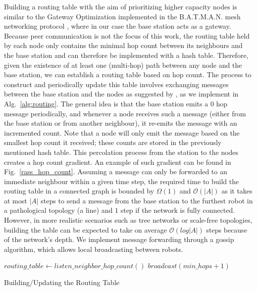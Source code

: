 Building a routing 
table with the aim of prioritizing higher capacity nodes is similar to the Gateway 
Optimization \cite{openMesh2021gateways} implemented in the \ac{B.A.T.M.A.N.} mesh networking
protocol \cite{johnson2008simple}, where in our case the base station acts as a gateway. Because peer communication is not the 
focus of this work, the routing table held by each node only contains the minimal hop count 
between its neighbours and the base station and can therefore
be implemented with a hash table. Therefore, given the existence of at least one (multi-hop) path between any node and the base station, we can establish a routing table based on hop count. The process to construct and periodically update this 
table involves exchanging messages between the base station and the nodes as suggested by 
\cite{abdullah2015detecting}, as we implement in Alg.~\ref{alg:routing}. The general idea is that the base station emits a 0 hop message periodically, and whenever a node receives such a message (either from the base station or from another neighbour), it re-emits the message with an incremented count. Note that a node will only emit the message based on the smallest hop count it received; these counts are stored in the previously mentioned hash table. This percolation process from the station to the nodes creates a hop count gradient. An example of such gradient can be found in Fig.~\ref{rass_hop_count}.
Assuming a message can only be forwarded to an immediate neighbour within a given time 
step, the required time to build the routing table in a connected graph is bounded by 
$\Omega(1)$ and $\mathcal{O}(|A|)$ as it takes at most $|A|$ steps to send a message from 
the base station to the furthest robot in a pathological topology (a line) and $1$ step if 
the network is fully connected. However, in more realistic scenarios such as tree networks 
or scale-free topologies, building the table can be expected to take on average 
$\mathcal{O}(log|A|)$ steps because of the network's depth. We implement message forwarding through a gossip algorithm, which allows local broadcasting between robots.

\begin{algorithm}[htbp]
\small
\SetAlgoLined
\DontPrintSemicolon
    $routing\_table \longleftarrow listen\_neighbor\_hop\_count()$\;
    \;
    \;
    $broadcast(min\_hops + 1)$\;
\caption{Building/Updating the Routing Table}
\label{alg:routing}
\end{algorithm}

